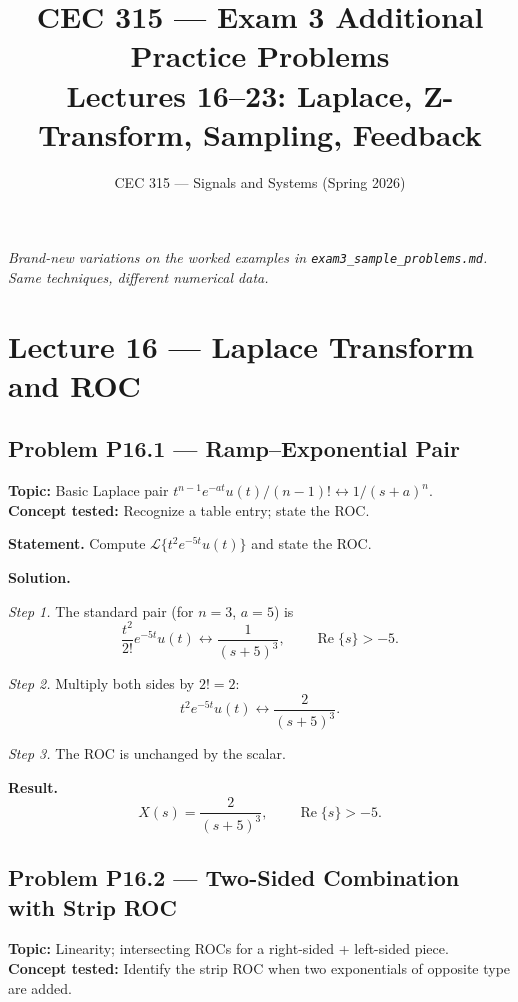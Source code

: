 \documentclass[11pt]{article}
\title{CEC 315 --- Exam 3 Additional Practice Problems\\
\large Lectures 16--23: Laplace, Z-Transform, Sampling, Feedback}
\author{CEC 315 --- Signals and Systems (Spring 2026)}
\date{}
\newcommand{\Real}{\operatorname{Re}}
\begin{document}
\maketitle

\begin{center}
\textit{Brand-new variations on the worked examples in
\texttt{exam3\_sample\_problems.md}.\\
Same techniques, different numerical data.}
\end{center}

\tableofcontents
\newpage

\section{Lecture 16 --- Laplace Transform and ROC}

\subsection{Problem P16.1 --- Ramp--Exponential Pair}
\textbf{Topic:} Basic Laplace pair $t^{n-1}e^{-at}u(t)/(n-1)!\leftrightarrow 1/(s+a)^n$.\\
\textbf{Concept tested:} Recognize a table entry; state the ROC.

\textbf{Statement.} Compute $\mathcal{L}\{t^{2}e^{-5t}u(t)\}$ and state the ROC.

\textbf{Solution.}

\textit{Step 1.} The standard pair (for $n=3$, $a=5$) is
\[
\frac{t^{2}}{2!}e^{-5t}u(t)\leftrightarrow \frac{1}{(s+5)^{3}},\qquad \Real\{s\}>-5.
\]

\textit{Step 2.} Multiply both sides by $2!=2$:
\[
t^{2}e^{-5t}u(t)\leftrightarrow \frac{2}{(s+5)^{3}}.
\]

\textit{Step 3.} The ROC is unchanged by the scalar.

\textbf{Result.}
\[
\boxed{\,X(s) = \frac{2}{(s+5)^{3}},\qquad \Real\{s\}>-5.\,}
\]

\subsection{Problem P16.2 --- Two-Sided Combination with Strip ROC}
\textbf{Topic:} Linearity; intersecting ROCs for a right-sided + left-sided piece.\\
\textbf{Concept tested:} Identify the strip ROC when two exponentials of opposite type are added.
\end{document}
